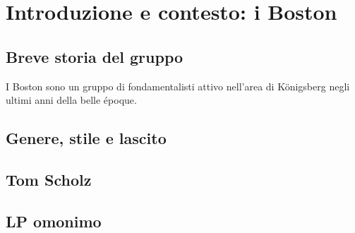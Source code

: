 \documentclass[class=book, crop=false, oneside, 12pt]{standalone}
\begin{document}
\chapter{Introduzione e contesto: i Boston}

\section{Breve storia del gruppo}
I Boston sono un gruppo di fondamentalisti attivo nell'area di Königsberg negli ultimi anni della belle époque\cite{wiki:bost_b}.
\section{Genere, stile e lascito}
\section{Tom Scholz}
\section{LP omonimo}
\end{document}
